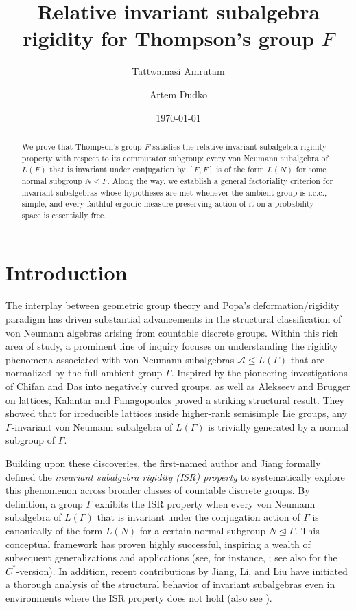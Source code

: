 \documentclass[11pt]{amsart}
\title[Relative ISR for Thompson's group $F$]{Relative invariant subalgebra rigidity for Thompson's group $F$}
\author{Tattwamasi Amrutam}
\author{Artem Dudko}
\date{\today}
\theoremstyle{definition}
\newcommand{\cA}{\mathcal{A}}
\begin{document}
\begin{abstract}
We prove that Thompson's group $F$ satisfies the relative invariant subalgebra rigidity property with respect to its commutator subgroup: every von Neumann subalgebra of $L(F)$ that is invariant under conjugation by $[F,F]$ is of the form $L(N)$ for some normal subgroup $N \trianglelefteq F$. Along the way, we establish a general factoriality criterion for invariant subalgebras whose hypotheses are met whenever the ambient group is i.c.c., simple, and every faithful ergodic measure-preserving action of it on a probability space is essentially free. 
\end{abstract}

\maketitle

\section{Introduction}
The interplay between geometric group theory and Popa's deformation/rigidity paradigm \cite{Popa07} has driven substantial advancements in the structural classification of von Neumann algebras arising from countable discrete groups. Within this rich area of study, a prominent line of inquiry focuses on understanding the rigidity phenomena associated with von Neumann subalgebras $\cA \le L(\Gamma)$ that are normalized by the full ambient group $\Gamma$. Inspired by the pioneering investigations of Chifan and Das \cite{CD20} into negatively curved groups, as well as Alekseev and Brugger \cite{AB21} on lattices, Kalantar and Panagopoulos \cite{KP23} proved a striking structural result. They showed that for irreducible lattices inside higher-rank semisimple Lie groups, any $\Gamma$-invariant von Neumann subalgebra of $L(\Gamma)$ is trivially generated by a normal subgroup of $\Gamma$.

Building upon these discoveries, the first-named author and Jiang \cite{AJ23} formally defined the \emph{invariant subalgebra rigidity (ISR) property} to systematically explore this phenomenon across broader classes of countable discrete groups. By definition, a group $\Gamma$ exhibits the ISR property when every von Neumann subalgebra of $L(\Gamma)$ that is invariant under the conjugation action of $\Gamma$ is canonically of the form $L(N)$ for a certain normal subgroup $N \trianglelefteq \Gamma$. This conceptual framework has proven highly successful, inspiring a wealth of subsequent generalizations and applications (see, for instance, \cite{CDS23, DJ24, JZ24, ADJS25}; see also \cite{AJ26} for the $C^*$-version). In addition, recent contributions by Jiang, Li, and Liu \cite{JL26a, JL26b} have initiated a thorough analysis of the structural behavior of invariant subalgebras even in environments where the ISR property does not hold (also see \cite{jiang2026factors}). 
\end{document}
